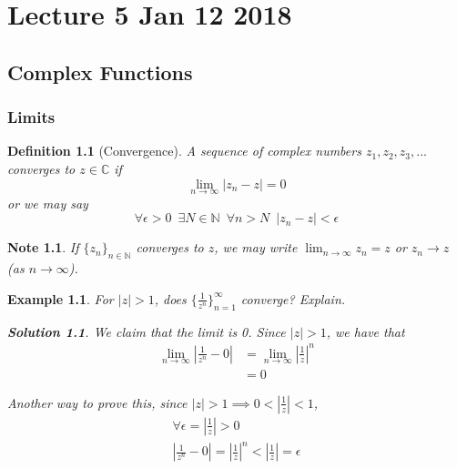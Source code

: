 \documentclass[11pt, oneside]{book}
\theoremstyle{break}
\newtheorem*{solution}{Solution}
\newtheorem*{note}{Note}
\newtheorem{defn}{Definition}[section]
\newtheorem{eg}{Example}[section]
\newcommand{\abs}[1]{\left|#1\right|}						%
\begin{document}


\chapter{Lecture 5 Jan 12 2018}
	\label{chapter:lecture_5_jan_12_2018}

\section{Complex Functions} %
\label{sec:complex_functions}

\subsection{Limits} %
\label{sub:limits}

\begin{defn}[Convergence]\label{defn:Convergence}
	A sequence of complex numbers $z_1, z_2, z_3, ...$ converges to $z \in \mathbb{C}$ if
	\begin{equation}
		\lim_{n \to \infty} \abs{z_n - z} = 0
	\end{equation}
	or we may say
	\begin{equation}
		\forall \epsilon > 0 \enspace \exists N \in \mathbb{N} \enspace \forall n > N \enspace \abs{z_n - z} < \epsilon
	\end{equation}
\end{defn}

\begin{note}
 If $\{z_n\}_{n \in \mathbb{N}}$ converges to $z$, we may write $\lim_{n \to \infty} z_n = z$ or $z_n \to z$ (as $n \to \infty$).
\end{note}

\begin{eg}
	For $\abs{z} > 1$, does $\{\frac{1}{z^n}\}^\infty_{n = 1}$ converge? Explain.

	\begin{solution}
		We claim that the limit is 0. Since $\abs{z} > 1$, we have that
		\begin{align*}
			\lim_{n \to \infty} \abs{\frac{1}{z^n} - 0}
				&= \lim_{n \to \infty} \abs{\frac{1}{z}}^n \\
				&= 0
		\end{align*}

		Another way to prove this, since $\abs{z} > 1 \implies 0 < \abs{\frac{1}{z}} < 1$,
		\begin{gather*}
			\forall \epsilon = \abs{\frac{1}{z}} > 0 \\
			\abs{\frac{1}{z^n} - 0} = \abs{\frac{1}{z}}^n < \abs{\frac{1}{z}} = \epsilon
		\end{gather*}
	\end{solution}
\end{eg}
\end{document}
